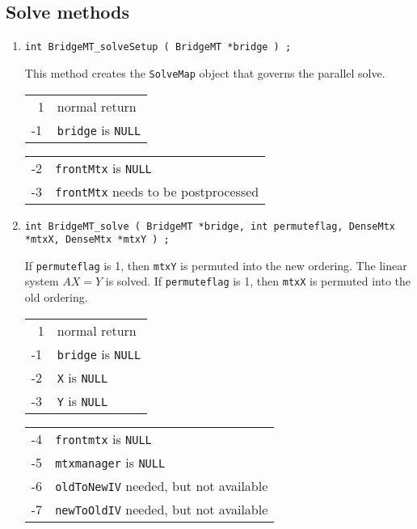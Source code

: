 \subsection{Solve methods}
\label{subsection:BridgeMT:proto:solve}
\par
\begin{enumerate}
\item
\begin{verbatim}
int BridgeMT_solveSetup ( BridgeMT *bridge ) ;
\end{verbatim}
This method creates the {\tt SolveMap} object that governs the
parallel solve.
\par {}
\begin{center}
\begin{tabular}{ll}
~1 & normal return \\
-1 & \texttt{bridge} is \texttt{NULL}
\end{tabular}
\begin{tabular}{ll}
-2 & \texttt{frontMtx} is \texttt{NULL} \\
-3 & \texttt{frontMtx} needs to be postprocessed
\end{tabular}
\end{center}
\item
\begin{verbatim}
int BridgeMT_solve ( BridgeMT *bridge, int permuteflag, DenseMtx *mtxX, DenseMtx *mtxY ) ;
\end{verbatim}
If \texttt{permuteflag} is 1, then \texttt{mtxY} is permuted into
the new ordering.
The linear system $AX = Y$ is solved.
If \texttt{permuteflag} is 1, then \texttt{mtxX} is permuted into
the old ordering.
\par {}
\begin{center}
\begin{tabular}{ll}
~1 & normal return \\
-1 & \texttt{bridge} is \texttt{NULL} \\
-2 & \texttt{X} is \texttt{NULL} \\
-3 & \texttt{Y} is \texttt{NULL} \\
\end{tabular}
\begin{tabular}{ll}
-4 & \texttt{frontmtx} is \texttt{NULL} \\
-5 & \texttt{mtxmanager} is \texttt{NULL} \\
-6 & \texttt{oldToNewIV} needed, but not available \\
-7 & \texttt{newToOldIV} needed, but not available \\
\end{tabular}
\end{center}
\end{enumerate}
